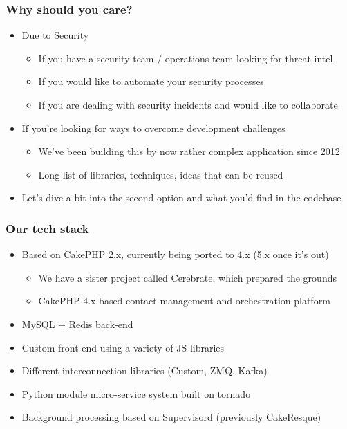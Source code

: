 \begin{frame}
\frametitle{Why should you care?}
    \begin{itemize}
        \item Due to Security
        \begin{itemize}
            \item If you have a security team / operations team looking for threat intel
            \item If you would like to automate your security processes
            \item If you are dealing with security incidents and would like to collaborate
        \end{itemize}
        \item If you're looking for ways to overcome development challenges
        \begin{itemize}
            \item We've been building this by now rather complex application since 2012
            \item Long list of libraries, techniques, ideas that can be reused
        \end{itemize}
        \item Let's dive a bit into the second option and what you'd find in the codebase
    \end{itemize}
\end{frame}

\begin{frame}
\frametitle{Our tech stack}
    \begin{itemize}
        \item Based on CakePHP 2.x, currently being ported to 4.x (5.x once it's out)
        \begin{itemize}
            \item We have a sister project called Cerebrate, which prepared the grounds
            \item CakePHP 4.x based contact management and orchestration platform
        \end{itemize}
        \item MySQL + Redis back-end
        \item Custom front-end using a variety of JS libraries
        \item Different interconnection libraries (Custom, ZMQ, Kafka)
        \item Python module micro-service system built on tornado
        \item Background processing based on Supervisord (previously CakeResque)
    \end{itemize}
\end{frame}

